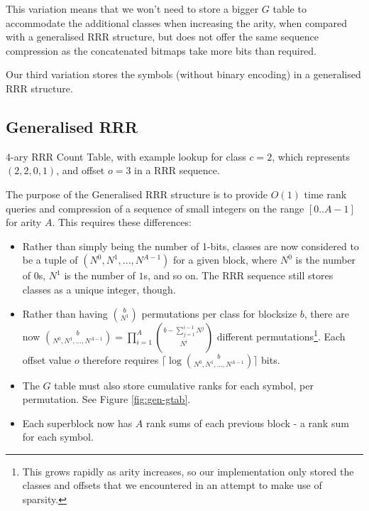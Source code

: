 This variation means that we won't need to store a bigger $G$ table to 
accommodate the additional classes when increasing the arity, when compared with
a generalised RRR structure, but does not offer the same sequence compression as
the concatenated bitmaps take more bits than required.

Our third variation stores the symbols (without binary encoding) in a 
generalised RRR structure.

\subsection{Generalised RRR}
\label{sec:gen-rrr}

	{4-ary RRR Count Table, with example lookup for class $c = 2$, 
	which represents $(2, 2, 0, 1)$, and offset $o = 3$ in a RRR
	sequence.}
	
The purpose of the Generalised RRR structure is to provide $O(1)$ time rank
queries and compression of a sequence of small integers on the range 
$[0..A-1]$ for arity $A$. This requires these differences:

\begin{itemize}
	\item
		Rather than simply being the number of 1-bits, classes are now 
		considered to be a tuple of $(N^0, N^1, ..., N^{A-1})$ for a given 
		block, where $N^0$ is the number of $0$s, $N^1$ is the number of $1$s, 
		and so on. The RRR sequence still stores classes as a unique integer, 
		though.

	\item
		Rather than having $b \choose N^1$ permutations per class for blocksize 
		$b$, there are now ${b \choose N^0, N^1,...,N^{A-1}} = 
		\prod_{i = 1}^{A} {{b - \sum_{j = 1}^{i - 1} N^j} \choose N^i}
		$ different permutations\footnote{This grows rapidly as arity increases, 
		so our implementation only stored the classes and offsets that we 
		encountered in an attempt to make use of sparsity.}.
		Each offset value $o$ therefore requires $\lceil\log {b \choose N^0, 
		N^1,...,N^{A-1}}\rceil$ bits.

	\item
		The $G$ table must also store cumulative ranks for each symbol, per 
		permutation. See Figure \ref{fig:gen-gtab}.

	\item
		Each superblock now has $A$ rank sums of each previous block - a rank 
		sum for each symbol.
\end{itemize}
